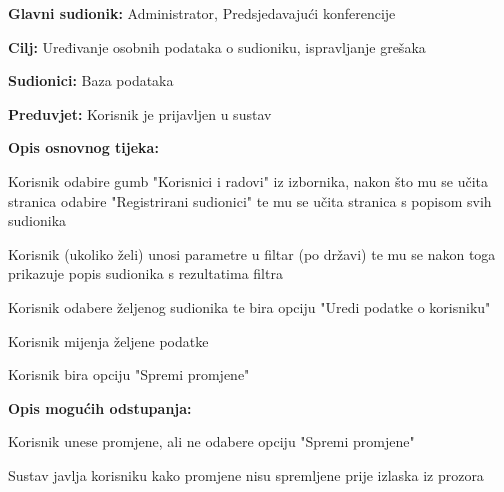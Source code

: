 					
					\noindent {}
					\begin{packed_item}
						\item \textbf{Glavni sudionik:} Administrator, Predsjedavajući konferencije
						\item \textbf{Cilj:} Uređivanje osobnih podataka o sudioniku, ispravljanje grešaka
						\item \textbf{Sudionici:} Baza podataka
						\item \textbf{Preduvjet:} Korisnik je prijavljen u sustav
						
						\item \textbf{Opis osnovnog tijeka:} 
						\item[] \begin{packed_enum}
							\item Korisnik odabire gumb "Korisnici i radovi" iz izbornika, nakon što mu se učita stranica odabire "Registrirani sudionici" te mu se učita stranica s popisom svih sudionika
							\item Korisnik (ukoliko želi) unosi parametre u filtar (po državi) te mu se nakon toga prikazuje popis sudionika s rezultatima filtra
							\item Korisnik odabere željenog sudionika te bira opciju "Uredi podatke o korisniku"
							\item Korisnik mijenja željene podatke
							\item Korisnik bira opciju "Spremi promjene"
						\end{packed_enum}
					
						\item \textbf{Opis mogućih odstupanja:}
						\item[] \begin{packed_enum}

							\item[5.a] Korisnik unese promjene, ali ne odabere opciju "Spremi promjene"
							\item[] \begin{packed_enum}
								\item[1.] Sustav javlja korisniku kako promjene nisu spremljene prije izlaska iz prozora
							\end{packed_enum}
						\end{packed_enum}
					\end{packed_item}


